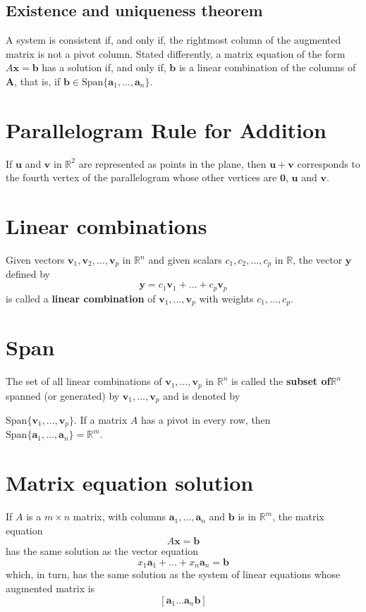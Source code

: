 \documentclass[oneside]{book} %
\theoremstyle{plain}
\begin{document}
\subsection{Existence and uniqueness theorem}
A system is consistent if, and only if, the rightmost column of the augmented
matrix is not a pivot column.
Stated differently, a matrix equation of the form \(A\mathbf{x} = \mathbf{b}\)
has a solution if, and only if, \(\mathbf{b}\) is a linear combination of the
columns of \(\mathbf{A}\), that is, if \(\mathbf{b} \in \mathrm{Span}
\{\mathbf{a}_1, \ldots, \mathbf{a}_n\}\).

\section{Parallelogram Rule for Addition}
If \(\mathbf{u}\) and \(\mathbf{v}\) in \(\mathbb{R}^2\)
are represented as points in the plane,
then \(\mathbf{u} + \mathbf{v}\) corresponds to the fourth vertex of the
parallelogram whose other vertices are \(\mathbf{0}\), \(\mathbf{u}\) and
\(\mathbf{v}\).

\section{Linear combinations}
Given vectors \(\mathbf{v}_1, \mathbf{v}_2, \ldots, \mathbf{v}_p\) in
\(\mathbb{R}^n\) and given scalars \(c_1, c_2, \ldots, c_p\) in \(\mathbb{R}\),
the vector \(\mathbf{y}\) defined by
\[ \mathbf{y} = c_1 \mathbf{v}_1 + \ldots + c_p \mathbf{v}_p \]
is called a \textbf{linear combination} of
\(\mathbf{v}_1, \ldots, \mathbf{v}_p\) with weights \(c_1, \ldots, c_p\).

\section{Span}
The set of all linear combinations of \(\mathbf{v}_1, \ldots, \mathbf{v}_p\) in
\(\mathbb{R}^n\) is called the \textbf{subset of}\(\mathbb{R}^n\) spanned (or
generated) by \(\mathbf{v}_1, \ldots, \mathbf{v}_p\) and is denoted by

\(\mathrm{Span}\{\mathbf{v}_1, \ldots, \mathbf{v}_p\}\). If a matrix \(A\) has a
pivot in every row, then \(\mathrm{Span} \{\mathbf{a}_1, \ldots, \mathbf{a}_n\}
= \mathbb{R}^m\).

\section{Matrix equation solution}
If \(A\) is a \(m \times n\) matrix, with columns \(\mathbf{a}_1, \ldots,
\mathbf{a}_n\) and \(\mathbf{b}\) is in \(\mathbb{R}^m\),
the matrix equation
\[ A\mathbf{x} = \mathbf{b} \]
has the same solution as the vector equation
\[ x_1\mathbf{a}_1 + \ldots + x_n\mathbf{a}_n = \mathbf{b} \]
which, in turn,
has the same solution as the system of linear equations whose
augmented matrix is
\[ [ \mathbf{a}_1 \ldots \mathbf{a}_n \mathbf{b} ] \]
\end{document}
